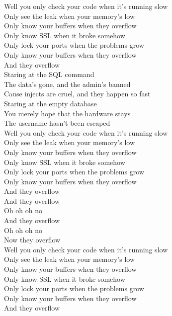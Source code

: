\documentclass[11pt,a5paper]{article}
\begin{document}
            Well you only check your code when it’s running slow \\
            Only see the leak when your memory’s low \\
            Only know your buffers when they overflow \\
            Only know SSL when it broke somehow \\
            Only lock your ports when the problems grow \\
            Only know your buffers when they overflow \\
            And they overflow \\

			Staring at the SQL command \\
            The data’s gone, and the admin’s banned \\
            Cause injects are cruel, and they happen so fast \\
            Staring at the empty database \\
            You merely hope that the hardware stays \\
            The username hasn’t been escaped \\

			Well you only check your code when it’s running slow \\
            Only see the leak when your memory’s low \\
            Only know your buffers when they overflow \\
            Only know SSL when it broke somehow \\
            Only lock your ports when the problems grow \\
            Only know your buffers when they overflow \\
            And they overflow \\

			And they overflow \\
            Oh oh oh no \\
            And they overflow \\
            Oh oh oh no \\
            Now they overflow \\
     
     		Well you only check your code when it’s running slow \\
            Only see the leak when your memory’s low \\
            Only know your buffers when they overflow \\
            Only know SSL when it broke somehow \\
            Only lock your ports when the problems grow \\
            Only know your buffers when they overflow \\
            And they overflow \\
            
\end{document}
